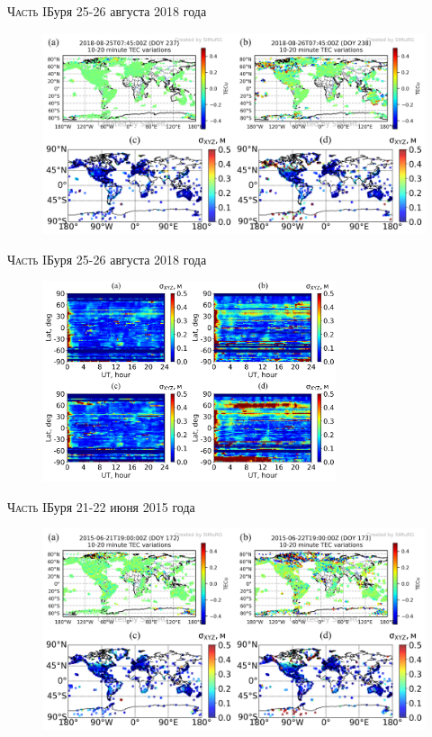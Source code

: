 \begin{frame}{\textsc{Часть I}}{Буря 25-26 августа 2018 года}
\begin{figure}
\includegraphics[width=\textwidth]{../fig/2018-237-238-07-45.png}    
\end{figure} 
\end{frame}

\begin{frame}{\textsc{Часть I}}{Буря 25-26 августа 2018 года}
\begin{figure}
\includegraphics[width=0.77\textwidth]{../fig/2018-237-238.png}   
\end{figure} 
\end{frame}

\begin{frame}{\textsc{Часть I}}{Буря 21-22 июня 2015 года}
\begin{figure}
\includegraphics[width=\textwidth]{../fig/2015-172-173-19-00.png}   
\end{figure} 
\end{frame}

